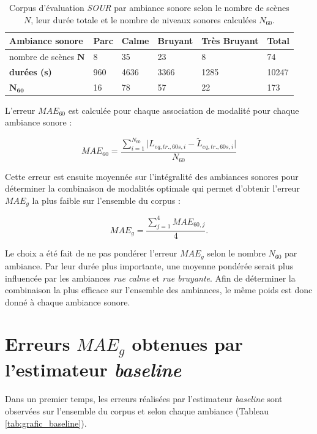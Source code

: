 \begin{table}[h!]
\caption{Corpus d'évaluation \textit{SOUR} par ambiance sonore selon le nombre de scènes $N$, leur durée totale et le nombre de niveaux sonores calculées $N_{60}$.}
\label{tab:resume_sour}
\centering
\begin{tabular}{L{3.5cm}C{2cm}C{2cm}C{2cm}C{2cm}C{2cm}}
\toprule
\textbf{Ambiance sonore} & \textbf{Parc} & \textbf{Calme} & \textbf{Bruyant} & \textbf{Très Bruyant} & \textbf{Total}\\ \midrule
nombre de scènes $\mathbf{N}$ & 8 & 35 & 23 & 8 & 74 \\
\textbf{durées (s)} & 960 & 4636 & 3366 & 1285 & 10247 \\
$\mathbf{N_{60}}$ & 16 & 78 & 57 & 22 & 173 \\ \bottomrule
\end{tabular}
\end{table}

L'erreur $MAE_{60}$ est calculée pour chaque association de modalité pour chaque ambiance sonore : 

\begin{equation}
MAE_{60} = \frac{\sum_{i = 1}^{N_{60}}\vert L_{eq,tr.,60s, i} - \tilde{L}_{eq,tr.,60s, i}\vert}{N_{60}}
\end{equation}

Cette erreur est ensuite moyennée sur l'intégralité des ambiances sonores pour déterminer la combinaison de modalités optimale qui permet d'obtenir l'erreur $MAE_g$ la plus faible sur l'ensemble du corpus :
  
\begin{equation}
MAE_{g} = \frac{\sum_{j = 1}^4 MAE_{60,j}}{4}.
\end{equation}

Le choix a été fait de ne pas pondérer l'erreur $MAE_{g}$ selon le nombre $N_{60}$ par ambiance. Par leur durée plus importante, une moyenne pondérée serait plus influencée par les ambiances \textit{rue calme} et \textit{rue bruyante}. Afin de déterminer la combinaison la plus efficace sur l'ensemble des ambiances, le même poids est donc donné à chaque ambiance sonore.


\section{Erreurs $MAE_g$ obtenues par l'estimateur \textit{baseline}}
Dans un premier temps, les erreurs réalisées par l'estimateur \textit{baseline} sont observées sur l'ensemble du corpus et selon chaque ambiance (Tableau \ref{tab:grafic_baseline}).

